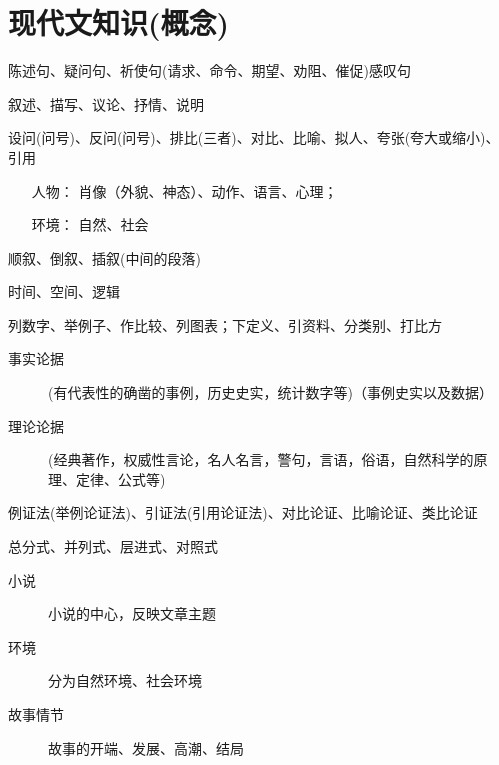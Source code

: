 \tableofcontents
\label{contents}
\newpage
{}

\section{现代文知识(概念)}

陈述句、疑问句、祈使句(请求、命令、期望、劝阻、催促)感叹句

叙述、描写、议论、抒情、说明

设问(问号)、反问(问号)、排比(三者)、对比、比喻、拟人、夸张(夸大或缩小)、引用

\begin{itemize}
\item[人物：]肖像（外貌、神态）、动作、语言、心理；
\item[环境：]自然、社会
\end{itemize}
顺叙、倒叙、插叙(中间的段落)

时间、空间、逻辑

列数字、举例子、作比较、列图表；下定义、引资料、分类别、打比方

\begin{description}
\item [事实论据](有代表性的确凿的事例，历史史实，统计数字等)（事例史实以及数据）
\item [理论论据](经典著作，权威性言论，名人名言，警句，言语，俗语，自然科学的原理、定律、公式等)
\end{description}

例证法(举例论证法)、引证法(引用论证法)、对比论证、比喻论证、类比论证

总分式、并列式、层进式、对照式

\begin{description}
\item[小说]小说的中心，反映文章主题
\item[环境]分为自然环境、社会环境
\item[故事情节]故事的开端、发展、高潮、结局
\end{description}

